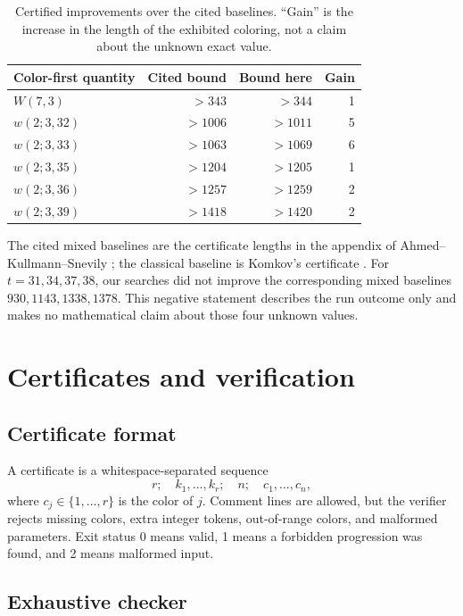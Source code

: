 \documentclass[11pt]{article}
\begin{document}
\begin{table}[ht]
\centering
\caption{Certified improvements over the cited baselines.  ``Gain'' is the
increase in the length of the exhibited coloring, not a claim about the
unknown exact value.}
\label{tab:results}
\begin{tabular}{@{}lrrr@{}}
\toprule
Color-first quantity & Cited bound & Bound here & Gain\\
\midrule
\(W(7,3)\)       & \(>343\)  & \(>344\)  & 1\\
\(w(2;3,32)\)    & \(>1006\) & \(>1011\) & 5\\
\(w(2;3,33)\)    & \(>1063\) & \(>1069\) & 6\\
\(w(2;3,35)\)    & \(>1204\) & \(>1205\) & 1\\
\(w(2;3,36)\)    & \(>1257\) & \(>1259\) & 2\\
\(w(2;3,39)\)    & \(>1418\) & \(>1420\) & 2\\
\bottomrule
\end{tabular}
\end{table}

The cited mixed baselines are the certificate lengths in the appendix of
Ahmed--Kullmann--Snevily \cite{ahmed2014}; the classical baseline is
Komkov's certificate \cite{komkov2020}.  For \(t=31,34,37,38\), our searches
did not improve the corresponding mixed baselines \(930,1143,1338,1378\).
This negative statement describes the run outcome only and makes no
mathematical claim about those four unknown values.

\section{Certificates and verification}
\label{sec:verification}

\subsection{Certificate format}

A certificate is a whitespace-separated sequence
\[
  r;\quad k_1,\ldots,k_r;\quad n;\quad c_1,\ldots,c_n,
\]
where \(c_j\in\{1,\ldots,r\}\) is the color of \(j\).  Comment lines are
allowed, but the verifier rejects missing colors, extra integer tokens,
out-of-range colors, and malformed parameters.  Exit status 0 means valid,
1 means a forbidden progression was found, and 2 means malformed input.

\subsection{Exhaustive checker}
\end{document}
